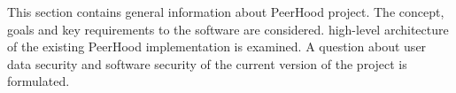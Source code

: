 %
%
This section contains general information about PeerHood project. 
%
The concept, goals and key requirements to the software are considered. 
%
 high-level architecture of the existing PeerHood implementation is examined. 
%
A question about user data security and software security of the current version of the project is formulated. 